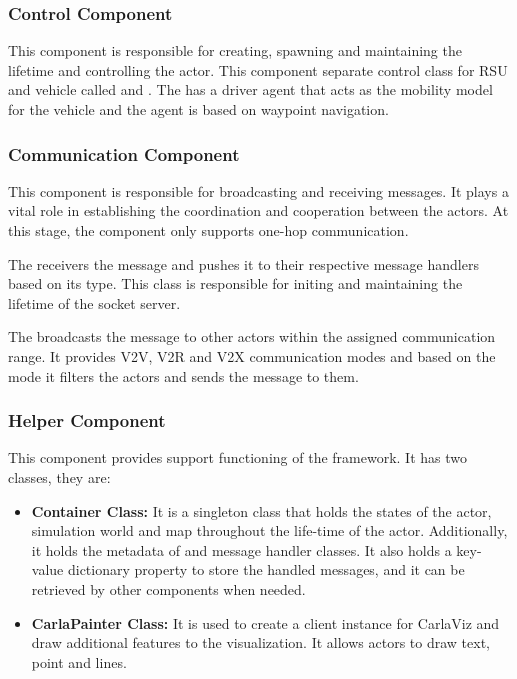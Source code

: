 \subsubsection{Control Component}
This component is responsible for creating, spawning and maintaining the lifetime and controlling the actor. This component separate control class for RSU and vehicle called  and . The  has a driver agent that acts as the mobility model for the vehicle and the agent is based on waypoint navigation.

\subsubsection{Communication Component}
This component is responsible for broadcasting and receiving messages. It plays a vital role in establishing the coordination and cooperation between the actors. At this stage, the component only supports one-hop communication. 

The  receivers the message and pushes it to their respective message handlers based on its type. This class is responsible for initing and maintaining the lifetime of the socket server. 

The  broadcasts the message to other actors within the assigned communication range. It provides V2V, V2R and V2X communication modes and based on the mode it filters the actors and sends the message to them.

\subsubsection{Helper Component}
This component provides support functioning of the framework. It has two classes, they are:

\begin{itemize}
    \item  \textbf{Container Class:} It is a singleton class that holds the states of the actor, simulation world and map throughout the life-time of the actor. Additionally, it holds the metadata of  and message handler classes. It also holds a key-value dictionary property to store the handled messages, and it can be retrieved by other components when needed. 
    \item \textbf{CarlaPainter Class:} It is used to create a client instance for CarlaViz and draw additional features to the visualization. It allows actors to draw text, point and lines.
\end{itemize}

